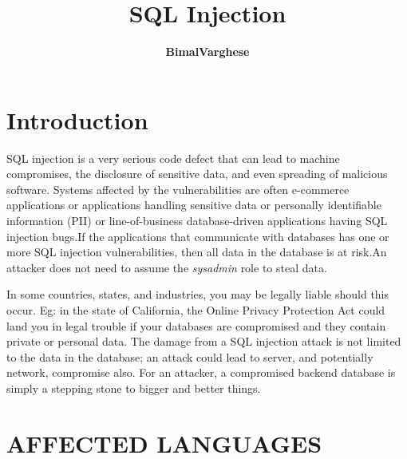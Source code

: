 \documentclass[a4paper, 11pt]{article} %
\title{\textbf{SQL Injection}\\ %
	} %
\author{\textbf{BimalVarghese} %
	\\{\textit{}}} %
\makeatletter
\renewcommand{\maketitle}{ %
	\begin{center} %
		{\LARGE\@title} %
		
		\vspace{10pt} %
		
		{\small\@author} %
		
	\end{center}
}
\makeatother
\begin{document}
	
	\maketitle %
	
	
	
	
	
	\section*{Introduction}
	
	 SQL injection is a very serious code defect that can lead to machine compromises, the disclosure of sensitive data, and even spreading of malicious software.
	 Systems affected by the vulnerabilities are often e-commerce applications or applications handling sensitive data or personally identifiable information (PII) or line-of-business database-driven applications having SQL injection bugs.If the applications that communicate with databases has one or more SQL injection vulnerabilities, then all data in the database is at risk.An attacker does not need to assume the \textit{sysadmin} role to steal data.
	
	
	In some countries, states, and industries, you may be legally liable should this occur.
	Eg: in the state of California, the Online Privacy Protection Act could land you
	in legal trouble if your databases are compromised and they contain private or personal
	data. The damage from a SQL injection attack is not limited to the data in the database; an attack could lead to server, and potentially network, compromise also. For an
	attacker, a compromised backend database is simply a stepping stone to bigger and
	better things.
	
	\section*{AFFECTED LANGUAGES}
	
\end{document}
